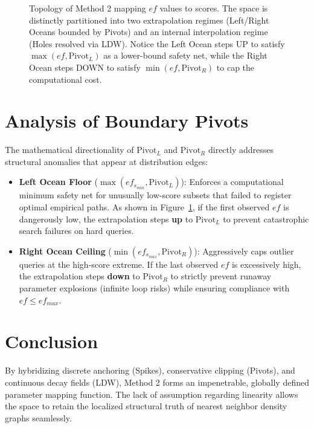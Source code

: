 \documentclass[11pt,a4paper]{article}
\begin{document}
\begin{figure}[htbp]
    \caption{Topology of Method 2 mapping $ef$ values to scores. The space is distinctly partitioned into two extrapolation regimes (Left/Right Oceans bounded by Pivots) and an internal interpolation regime (Holes resolved via LDW). Notice the Left Ocean steps UP to satisfy $\max(ef, \text{Pivot}_L)$ as a lower-bound safety net, while the Right Ocean steps DOWN to satisfy $\min(ef, \text{Pivot}_R)$ to cap the computational cost.}
    \label{fig:fill_viz}
\end{figure}

\section{Analysis of Boundary Pivots}
The mathematical directionality of $\text{Pivot}_L$ and $\text{Pivot}_R$ directly addresses structural anomalies that appear at distribution edges:
\begin{itemize}
    \item \textbf{Left Ocean Floor} ($\max(ef_{s_{min}}, \text{Pivot}_L)$): Enforces a computational minimum safety net for unusually low-score subsets that failed to register optimal empirical paths. As shown in Figure~\ref{fig:fill_viz}, if the first observed $ef$ is dangerously low, the extrapolation steps \textbf{up} to $\text{Pivot}_L$ to prevent catastrophic search failures on hard queries.
    \item \textbf{Right Ocean Ceiling} ($\min(ef_{s_{max}}, \text{Pivot}_R)$): Aggressively caps outlier queries at the high-score extreme. If the last observed $ef$ is excessively high, the extrapolation steps \textbf{down} to $\text{Pivot}_R$ to strictly prevent runaway parameter explosions (infinite loop risks) while ensuring compliance with $ef \leq ef_{max}$.
\end{itemize}

\section{Conclusion}
By hybridizing discrete anchoring (Spikes), conservative clipping (Pivots), and continuous decay fields (LDW), Method 2 forms an impenetrable, globally defined parameter mapping function. The lack of assumption regarding linearity allows the space to retain the localized structural truth of nearest neighbor density graphs seamlessly.
\end{document}
